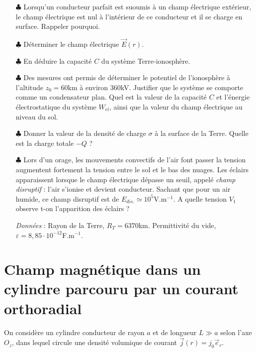 \documentclass{report}
\begin{document}
\begin{itemize}

	\item[$\clubsuit$] Lorsqu'un conducteur parfait est suoumis à un champ électrique extérieur, le champ électrique est nul à l'intérieur de ce conducteur et il se charge en surface. Rappeler pourquoi.
	
	\item[$\clubsuit$] Déterminer le champ électrique $\vec{E}(r)$.
		
	\item[$\clubsuit$] En déduire la capacité $C$ du système Terre-ionosphère.
	
	\item[$\clubsuit$] Des mesures ont permis de déterminer le potentiel de l'ionosphère à l'altitude $z_0=60$km à environ 360kV. Justifier que le système se comporte comme un condensateur plan. Quel est la valeur de la capacité $C$ et l'énergie électrostatique du système $W_{el}$, ainsi que la valeur du champ électrique au niveau du sol.
	
	\item[$\clubsuit$] Donner la valeur de la densité de charge $\sigma$ à la surface de la Terre. Quelle est la charge totale $-Q$ ?
	
	\item[$\clubsuit$] Lors d'un orage, les mouvements convectifs de l'air font passer la tension augmentent fortement la tension entre le sol et le bas des nuages. Les éclairs apparaissent lorsque le champ électrique dépasse un seuil, appelé \textit{champ disruptif} : l'air s'ionise et devient conducteur. Sachant que pour un air humide, ce champ disruptif est de $E_{dis.}\simeq10^{5}$V.m$^{-1}$. A quelle tension $V_1$ observe t-on l'apparition des éclairs ?
	
	
	\textit{Données} : Rayon de la Terre, $R_T=6370$km. Permittivité du vide, $\varepsilon=8,85\cdot10^{-12}$F.m$^{-1}$.
	
\end{itemize}

\newpage

\section*{Champ magnétique dans un cylindre parcouru par un courant orthoradial}

On considère un cylindre conducteur de rayon $a$ et de longueur $L\gg a$ selon l'axe $O_z$, dans lequel circule une densité volumique de courant $\vec{j}(r)=j_0\vec{e}_r$.
\end{document}
